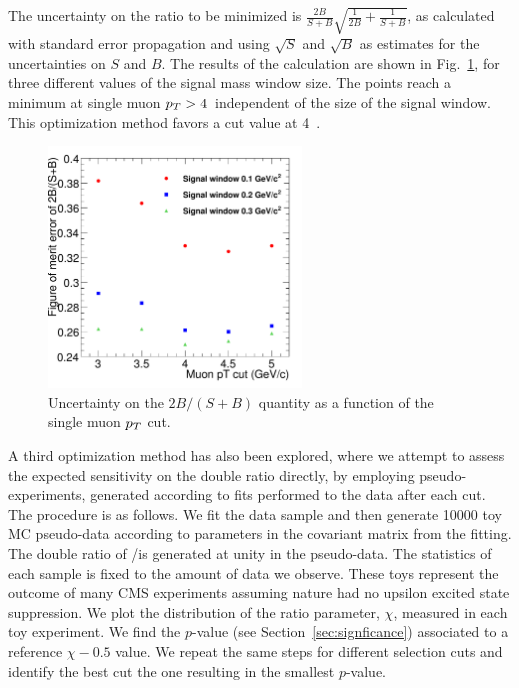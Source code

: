 The uncertainty on the ratio to be minimized is $\frac{2B}{S+B}\sqrt{\frac{1}{2B}+\frac{1}{S+B}}$, as calculated with standard error propagation and using  $\sqrt{S}$ and $\sqrt{B}$ as estimates for the uncertainties on $S$ and $B$.  
%
The results of the calculation are shown in Fig.~\ref{fig:mu_pt_ratio}, for three different values of the signal mass window size. The points reach a minimum at single muon $p_T>4$~\GeVc independent of the size of the signal window. This optimization method favors a \pt{} cut value at 4~\GeVc.

\begin{figure}[h!]
 \begin{center}
    \includegraphics[angle=0,width=0.6\textwidth]{chap_YInPbPbColl2011_figures/MuonPtFom2}
    \caption{Uncertainty on the $2B/(S+B)$ quantity as a function of the single muon $p_T$ cut.}
    \label{fig:mu_pt_ratio}
 \end{center}
\end{figure}

%
A third optimization method has also been explored, where we attempt to assess the expected sensitivity on the double ratio directly, by employing pseudo-experiments, generated according to fits performed to the data after each cut.
%
The procedure is as follows. We fit the data sample and then generate 10000 toy MC pseudo-data according to parameters in the covariant matrix from the fitting. The double ratio of \PbPb/\pp is generated at unity in the pseudo-data. The statistics of each sample is fixed to the amount of data we observe. These toys represent the outcome of many CMS experiments assuming nature had no upsilon excited state suppression. We plot the distribution of the ratio parameter, $\chi$, measured in each toy experiment. We find the $p$-value (see Section~\ref{sec:signficance}) associated to a reference $\chi-0.5$ value. We repeat the same steps for different selection cuts and identify the best cut the one resulting in the smallest $p$-value. 

